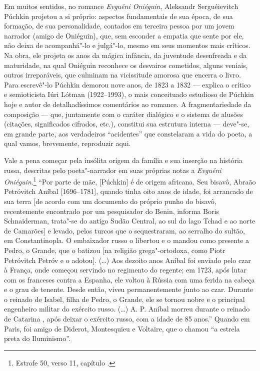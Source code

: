 Em muitos sentidos, no romance \emph{Evguéni Oniéguin},
Aleksandr Serguéievitch Púchkin
projetou a si próprio: aspectos fundamentais de sua época, de sua
formação, de sua personalidade, contados em terceira pessoa por um jovem
narrador (amigo de Oniéguin), que, sem esconder a empatia que sente por
ele, não deixa de acompanhá"-lo e julgá"-lo, mesmo em seus momentos mais
críticos. Na obra, ele projeta os anos da mágica infância, da juventude
desenfreada e da maturidade, na qual Oniéguin reconhece os desvairos
cometidos, alguns veniais, outros irreparáveis, que culminam na
vicissitude amorosa que encerra o livro. Para escrevê"-lo Púchkin demorou
nove anos, de 1823 a 1832 --- explica o crítico e semioticista Iúri
Lótman (1922--1993), o mais conceituado estudioso de
Púchkin hoje e autor de detalhadíssimos comentários ao romance. A
fragmentariedade da composição --- que, juntamente com o caráter dialógico e
o sistema de alusões (citações, significados cifrados, etc.), constitui
sua estrutura interna --- deve"-se, em grande parte, aos verdadeiros
``acidentes'' que constelaram a vida do poeta, a qual vamos, brevemente,
reproduzir aqui.

Vale a pena começar pela insólita origem da família e sua inserção na
história russa, descritas pelo poeta"-narrador em suas próprias notas a
\emph{Evguéni Oniéguin}.\footnote{Estrofe 50, verso 11, capítulo .} ``Por parte
de mãe, [Púchkin] é de origem africana. Seu bisavô, Abraão
Petróvitch Aníbal [1696--1781], quando tinha oito anos de idade, foi
arrancado de sua terra [de acordo com um documento do próprio punho
do bisavô, recentemente encontrado por um pesquisador do Benin, informa
Boris Schnaiderman, trata"-se do antigo Sudão Central, ao sul do lago
Tchad e ao norte de Camarões] e levado, pelos turcos que o
sequestraram, ao serralho do sultão, em Constantinopla. O embaixador
russo o libertou e o mandou como presente a Pedro, o Grande, que o batizou [na religião grega"-ortodoxa, como Piotr
Petróvitch Petróv e o adotou]. (\ldots{}) Aos dezoito anos Aníbal foi enviado pelo czar à França, onde começou servindo no regimento do
regente; em 1723, após lutar com os franceses contra a Espanha, ele
voltou à Rússia com uma ferida na cabeça e o grau de tenente.
Desde então, viveu permanentemente junto ao czar. Durante o
reinado de Isabel, filha de Pedro, o Grande, ele se tornou nobre e o
principal engenheiro militar do exército russo. (\ldots{}) A. P. Aníbal
morreu durante o reinado de Catarina , após deixar o
exército russo, com a idade de 85
anos.'' Quando em Paris, foi amigo de Diderot, Montesquieu e Voltaire,
que o chamou ``a estrela preta do Iluminismo''.

